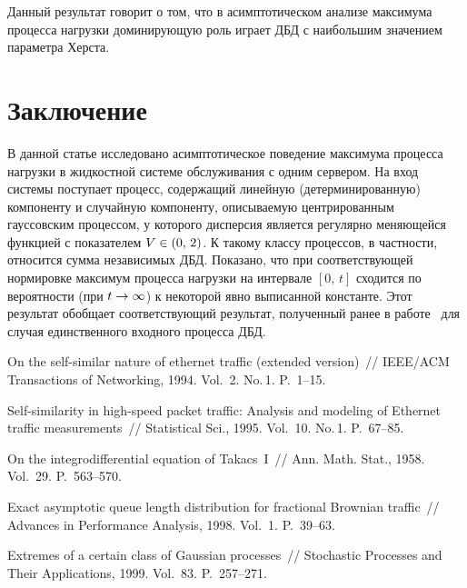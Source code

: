 \begin{multicols}{2}
\smallskip

Данный результат говорит о том, что в асимптотическом анализе
максимума процесса нагрузки доминирующую роль играет ДБД с
наибольшим значением параметра Херста.



\section{Заключение}

В данной статье исследовано асимптотическое поведение максимума
 процесса нагрузки в  жидкостной  системе обслуживания с одним сервером. На вход системы  поступает
процесс, содержащий   линейную (детерминированную) компоненту и
случайную компоненту, описываемую центрированным гауссовским
процессом, у которого дисперсия является регулярно меняющейся
функцией  с показателем  $V\hm\in (0,\,2)$. К такому классу процессов,
в частности, относится сумма независимых  ДБД.
 Показано, что при соответствующей  нормировке максимум процесса нагрузки на интервале $[0,\,t]$
сходится по вероятности (при  $t\hm\to \infty$) к некоторой явно
выписанной  константе. Этот результат обобщает соответствующий
результат, полученный ранее в работе~\cite{Zeevi} для случая
единственного входного процесса ДБД.

{\small\frenchspacing
{%
\begin{thebibliography}{99}

 On
the self-similar nature of ethernet traffic (extended version)~//
IEEE/ACM Transactions of Networking, 1994. Vol.~2. No.\,1. P.~1--15.

Self-similarity in high-speed packet traffic: Analysis and modeling
of Ethernet traffic measurements~// Statistical Sci., 1995.
Vol.~10. No.\,1. P.~67--85.

 On the integrodifferential equation of Takacs~I~// Ann. Math. Stat., 1958. Vol.~29. P.~563--570.

 Exact asymptotic queue length distribution for
fractional Brownian traffic~// Advances in Performance Analysis,
1998. Vol.~1. P.~39--63.

 Extremes of a certain class
of Gaussian processes~// Stochastic Processes and Their
Applications, 1999. Vol.~83. P.~257--271.



\end{thebibliography}}}
\end{multicols}
